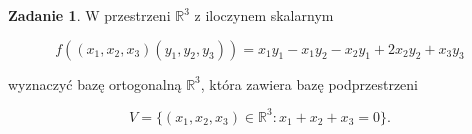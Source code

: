 \documentclass[11pt]{article}
\theoremstyle{definition}
\newtheorem{zadanie}{Zadanie}
\begin{document}
\begin{zadanie}
    W przestrzeni $\mathbb R^3$ z iloczynem skalarnym

    $$f((x_1,x_2,x_3)(y_1,y_2,y_3)) = x_1y_1-x_1y_2-x_2y_1+2x_2y_2+x_3y_3$$

    wyznaczyć bazę ortogonalną $\mathbb R^3$, która zawiera bazę podprzestrzeni

    $$V=\{(x_1,x_2,x_3)\in\mathbb R^3:x_1+x_2+x_3=0\}.$$
\end{zadanie}










\end{document}
